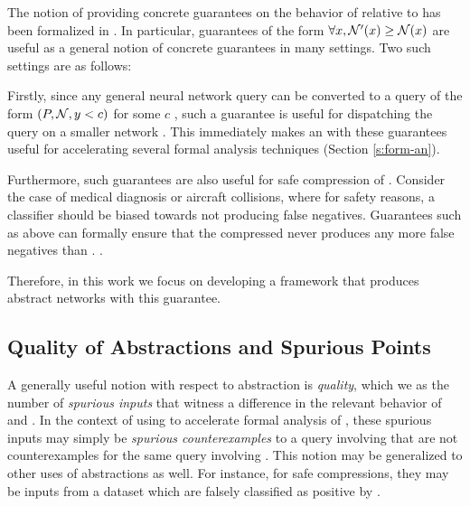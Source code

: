 The notion of providing concrete guarantees on the behavior of \abs relative to
\cnc has been formalized in \cite{cegar-nn}. In particular, guarantees of the
form $\forall x, \mathcal{N'}(x) \geq \mathcal{N}(x)$  are useful as a general notion of concrete
guarantees in many settings. Two such settings are as follows: 

Firstly, since any general neural network query can be converted to a query of
the form $(P, \mathcal{N}, y < c)$ for some $c$ \cite{cegar-nn, reluplex}  , such a guarantee is
useful for dispatching the query on a smaller network \cite{cegar-nn, cegarette,
cleverest-nn}. This immediately makes an \abs with these guarantees useful for
accelerating several formal analysis techniques (Section \ref{s:form-an}).

Furthermore, such guarantees are also useful for safe compression of \dnn.
Consider the case of medical diagnosis or aircraft
collisions\cite{acasxu}, where
for safety reasons, a classifier should be biased towards not producing false
negatives. Guarantees such as above can formally ensure that the compressed \abs
never produces any more false negatives than \cnc. .

Therefore, in this work we focus on developing a framework that produces
abstract networks with this guarantee.

\subsection{Quality of Abstractions and Spurious Points}
\label{s:qual}

A generally useful notion with respect to abstraction is \textit{quality},
which we as the number of \textit{spurious inputs} that witness a difference in
the relevant behavior of \abs and \cnc. In the context of using \abs to
accelerate formal analysis of \dnn, these spurious inputs may simply be
\textit{spurious counterexamples} \cite{cegar-nn, cleverst-nn} to a query
involving \abs that are not counterexamples for the same query involving \cnc.
This notion may be generalized to other uses of abstractions as well. For
instance, for safe compressions, they may be inputs from a dataset which
are falsely classified as positive by \abs. 

